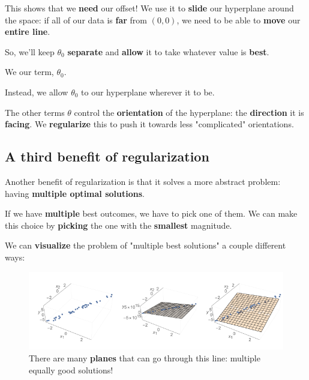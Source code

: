         This shows that we \textbf{need} our offset! We use it to \textbf{slide} our hyperplane around the space: if all of our data is \textbf{far} from $(0,0)$, we need to be able to \textbf{move} our \textbf{entire line}.
        
        So, we'll keep $\theta_0$ \textbf{separate} and \textbf{allow} it to take whatever value is \textbf{best}.\\
        
        \begin{concept}
            We  our  term, $\theta_0$. 
            
            Instead, we allow $\theta_0$ to  our hyperplane wherever it  to be.
        \end{concept}
        
        The other terms $\theta$ control the \textbf{orientation} of the hyperplane: the \textbf{direction} it is \textbf{facing}. We \textbf{regularize} this to push it towards less "complicated" orientations.

        
    \subsection{A third benefit of regularization}
    
        Another benefit of regularization is that it solves a more abstract problem: having \textbf{multiple optimal solutions}.
        
        If we have \textbf{multiple} best outcomes, we have to pick one of them. We can make this choice by \textbf{picking} the one with the \textbf{smallest} magnitude.
        
        We can \textbf{visualize} the problem of "multiple best solutions" a couple different ways:
        
        \begin{figure}[H]
        \centering
            \includegraphics[width=120mm,scale=0.5]{images/regression_images/Regularizer_Multiple_Solutions.png}
        
            \caption*{There are many \textbf{planes} that can go through this line: multiple equally good solutions!}
        \end{figure}
        
